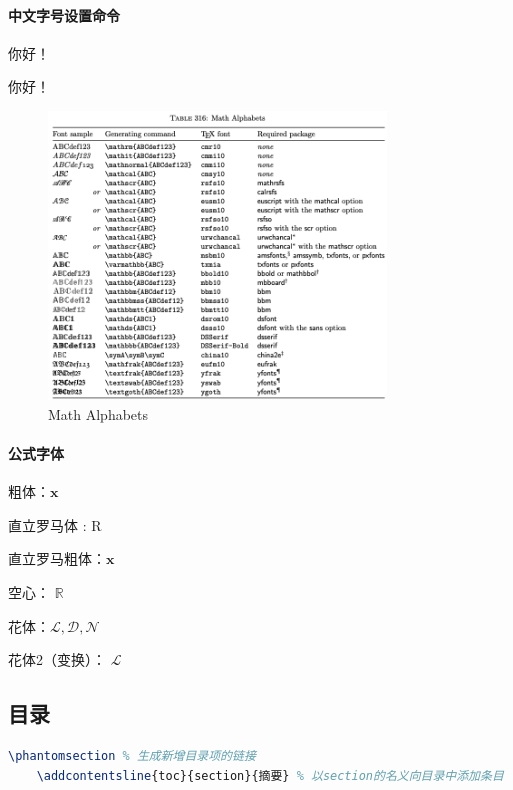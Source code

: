 \paragraph{中文字号设置命令}
\begin{compactenum}
    \item { 你好！}
    \item { 你好！}
\end{compactenum}

\begin{figure}[h]
    \centering
    \includegraphics[width=0.8\textwidth]{figure/MathAlphabets.png}
    \caption{Math Alphabets}
\end{figure}

\paragraph{公式字体}
\begin{compactenum}
    \item 粗体：$\boldsymbol x$
    \item 直立罗马体 : $\mathrm R$
    \item 直立罗马粗体：$\mathbf x$
    \item 空心： $\mathbb R$
    \item 花体：$\mathcal {L,D,N}$
    \item 花体2（变换）： $\mathscr{L}$
\end{compactenum}

\subsection{目录}
\begin{lstlisting}[language={tex}]
    \phantomsection % 生成新增目录项的链接
    \addcontentsline{toc}{section}{摘要} % 以section的名义向目录中添加条目
\end{lstlisting}

